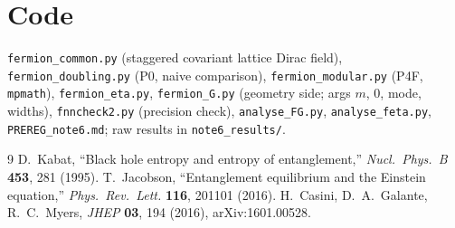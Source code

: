 \documentclass[11pt]{article}
\begin{document}
\section*{Code}
\texttt{fermion\_common.py} (staggered covariant lattice Dirac field), \texttt{fermion\_doubling.py} (P0, naive comparison), \texttt{fermion\_modular.py} (P4F, \texttt{mpmath}), \texttt{fermion\_eta.py}, \texttt{fermion\_G.py} (geometry side; args $m$, $0$, mode, widths), \texttt{fnncheck2.py} (precision check), \texttt{analyse\_FG.py}, \texttt{analyse\_feta.py}, \texttt{PREREG\_note6.md}; raw results in \texttt{note6\_results/}.

\begin{thebibliography}{9}
 D.~Kabat, ``Black hole entropy and entropy of entanglement,'' \emph{Nucl.\ Phys.\ B} \textbf{453}, 281 (1995).
 T.~Jacobson, ``Entanglement equilibrium and the Einstein equation,'' \emph{Phys.\ Rev.\ Lett.} \textbf{116}, 201101 (2016).
 H.~Casini, D.~A.~Galante, R.~C.~Myers, \emph{JHEP} \textbf{03}, 194 (2016), arXiv:1601.00528.
\end{thebibliography}
\end{document}
